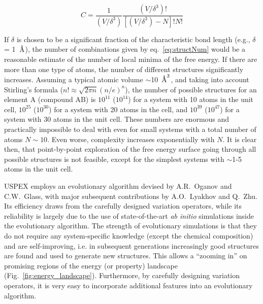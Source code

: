 \documentclass[12pt]{article}
\begin{document}
\begin{equation}\label{eq:structNum}
C=\frac{1}{(V/\delta^3)}\frac{(V/\delta^3)!}{[(V/\delta^3)-N]!N!}
\end{equation}

If $\delta$ is chosen to be a significant fraction of the characteristic bond
length (e.g., $\delta$ = 1~$\text{\r{A}}$), the number of combinations given by
eq.~\ref{eq:structNum} would be a reasonable estimate of the number of local
minima of the free energy. If there are more than one type of atoms, the number
of different structures significantly increases. Assuming a typical atomic
volume $\sim$10~$\text{\r{A}}^3$, and taking into account Stirling's formula
($n!\approx\sqrt{2 \pi n}(n/e)^n$), the number of possible structures for an
element A (compound AB) is $10^{11}$ ($10^{14}$) for a system with 10 atoms in
the unit cell, $10^{25}$ ($10^{30}$) for a system with 20 atoms in the cell, and
$10^{39}$ ($10^{47}$) for a system with 30 atoms in the unit cell. These numbers
are enormous and practically impossible to deal with even for small systems with
a total number of atoms $N\sim10$. Even worse, complexity increases
exponentially with $N$. It is clear then, that point-by-point exploration of the
free energy surface going through all possible structures is not feasible,
except for the simplest systems with $\sim$1-5 atoms in the unit cell.

USPEX \cite{Oganov2006, Glass2006} employs an evolutionary algorithm devised by
A.R.~Oganov and C.W.~Glass, with major subsequent contributions by A.O.~Lyakhov
and Q.~Zhu. Its efficiency draws from the carefully designed variation
operators, while its reliability is largely due to the use of state-of-the-art
\emph{ab initio} simulations inside the evolutionary algorithm. The strength of
evolutionary simulations is that they do not require any system-specific
knowledge (except the chemical composition) and are self-improving, i.e. in
subsequent generations increasingly good structures are found and used to
generate new structures. This allows a ``zooming in'' on promising regions of
the energy (or property) landscape (Fig.~\ref{fig:energy_landscape}).
Furthermore, by carefully designing variation operators, it is very easy to
incorporate additional features into an evolutionary algorithm.
\end{document}
